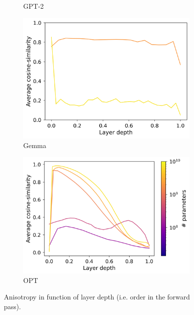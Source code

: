 \begin{figure}[ht]
\begin{subfigure}{0.45\columnwidth}
         \caption{GPT-2}
         \label{fig:gpt2_aniso}
    \end{subfigure}
    \begin{subfigure}{0.45\columnwidth}
         \includegraphics[width=\linewidth]{sources/part_1/softmax_bottleneck/imgs/gemma_anisotropy.png}
         \caption{Gemma}
         \label{fig:gemma_aniso}
    \end{subfigure}
    \begin{subfigure}{0.45\columnwidth}
         \includegraphics[width=\linewidth]{sources/part_1/softmax_bottleneck/imgs/opt_anisotropy.png}
         \caption{OPT}
         \label{fig:opt_aniso}
    \end{subfigure}
    \caption{Anisotropy in function of layer depth (i.e. order in the forward pass).}
    \label{fig:anisotropy}
\end{figure}

